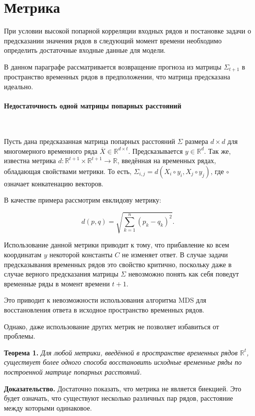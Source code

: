 \documentclass{article}
\begin{document}
\section{Метрика}

При условии высокой попарной корреляции входных рядов и постановке задачи о предсказании значения рядов в следующий момент времени необходимо определить достаточные входные данные для модели.

В данном параграфе рассматривается возвращение прогноза из матрицы $\Sigma_{t+1}$ в пространство временных рядов в предположении, что матрица предсказана идеально.

\paragraph{Недостаточность одной матрицы попарных расстояний}\

Пусть дана предсказанная матрица попарных расстояний $\Sigma$ размера $d \times d$ для многомерного временного ряда $\overline{X} \in \mathbb{R}^{d \times t}$. Предсказывается $y \in \mathbb{R}^d$. Так же, известна метрика $d : \mathbb{R}^{t+1} \times \mathbb{R}^{t+1} \rightarrow \mathbb{R}$, введённая на временных рядах, обладающая свойствами метрики. То есть, $\Sigma_{i,j} = d(X_i \circ y_i, X_j \circ y_j)$, где $\circ$ означает конкатенацию векторов.

В качестве примера рассмотрим евклидову метрику: 

$$d(p,q)=\sqrt{\sum_{k=1}^n (p_k-q_k)^2}.$$

Использование данной метрики приводит к тому, что прибавление ко всем координатам $y$ некоторой константы $C$ не изменяет ответ. В случае задачи предсказывания временных рядов это свойство критично, поскольку даже в случае верного предсказания матрицы $\Sigma$ невозможно понять как себя поведут временные ряды в момент времени $t+1$.

Это приводит к невозможности использования алгоритма MDS для восстановления ответа в исходное пространство временных рядов.

Однако, даже использование других метрик не позволяет избавиться от проблемы.

\textbf{Теорема 1.} \textit{Для любой метрики, введённой в пространстве временных рядов $\mathbb{R}^t$, существует более одного способа восстановить исходные временные ряды по построенной матрице попарных расстояний.}

\textbf{Доказательство.} Достаточно показать, что метрика не является биекцией. Это будет означать, что существуют несколько различных пар рядов, расстояние между которыми одинаковое.
\end{document}
